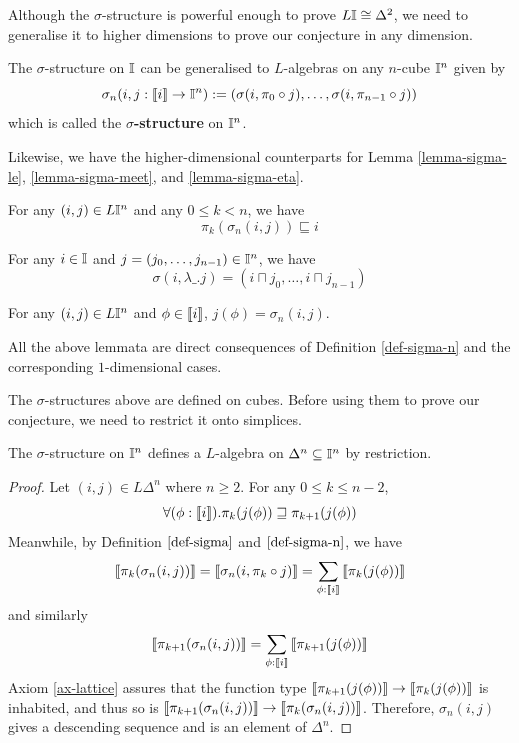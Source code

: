 Although the $\sigma$-structure is powerful enough to prove $L\mathbb{I}\cong\Delta^2$, we need to generalise it to higher dimensions to prove our conjecture in any dimension.
\begin{definition}
    \label{def-sigma-n}
    The $\sigma$-structure on $\mathbb{I}$ can be generalised to $L$-algebras on any $n$-cube $\mathbb{I}^n$ given by
    $$\sigma_n(i,j:\left\llbracket i\right\rrbracket\to\mathbb{I}^n):=(\sigma(i,\pi_0\circ j),\dots,\sigma(i,\pi_{n-1}\circ j))$$
    which is called the \textbf{$\sigma$-structure} on $\mathbb{I}^n$.
\end{definition}
Likewise, we have the higher-dimensional counterparts for Lemma \ref{lemma-sigma-le}, \ref{lemma-sigma-meet}, and \ref{lemma-sigma-eta}.
\begin{lemma}
    \label{lemma-sigma-le-n}
    For any $(i,j)\in L\mathbb{I}^n$ and any $0\le k< n$, we have
    $$\pi_k(\sigma_n(i,j))\sqsubseteq i$$
\end{lemma}
\begin{lemma}
    \label{lemma-sigma-meet-n}
    For any $i\in\mathbb{I}$ and $j=(j_0,\dots,j_{n-1})\in\mathbb{I}^n$, we have
    $$\sigma(i,\lambda\_.j)=(i\sqcap j_0,\dots,i\sqcap j_{n-1})$$
\end{lemma}
\begin{lemma}
    \label{lemma-sigma-eta-n}
    For any $(i,j)\in L\mathbb{I}^n$ and $\phi\in\left\llbracket i\right\rrbracket$, $j(\phi)=\sigma_n(i,j)$.
\end{lemma}
All the above lemmata are direct consequences of Definition \ref{def-sigma-n} and the corresponding $1$-dimensional cases.

The $\sigma$-structures above are defined on cubes. Before using them to prove our conjecture, we need to restrict it onto simplices.
\begin{lemma}
    The $\sigma$-structure on $\mathbb{I}^n$ defines a $L$-algebra on $\Delta^n\subseteq\mathbb{I}^n$ by restriction.
\end{lemma}
\begin{proof}
    Let $(i,j)\in L\Delta^n$ where $n\ge2$. For any $0\le k\le n-2$,
    $$\forall(\phi:\left\llbracket i\right\rrbracket).\pi_k(j(\phi))\sqsupseteq\pi_{k+1}(j(\phi))$$
    Meanwhile, by Definition $\ref{def-sigma}$ and $\ref{def-sigma-n}$, we have
    $$\left\llbracket\pi_k(\sigma_n(i,j))\right\rrbracket=\left\llbracket\sigma_n(i,\pi_k\circ j)\right\rrbracket=\sum_{\phi:\left\llbracket i\right\rrbracket}\left\llbracket\pi_k(j(\phi))\right\rrbracket$$
    and similarly
    $$\left\llbracket\pi_{k+1}(\sigma_n(i,j))\right\rrbracket=\sum_{\phi:\left\llbracket i\right\rrbracket}\left\llbracket\pi_{k+1}(j(\phi))\right\rrbracket$$
    Axiom \ref{ax-lattice} assures that the function type $\left\llbracket\pi_{k+1}(j(\phi))\right\rrbracket\to\left\llbracket\pi_k(j(\phi))\right\rrbracket$ is inhabited, and thus so is $\left\llbracket\pi_{k+1}(\sigma_n(i,j))\right\rrbracket\to\left\llbracket\pi_k(\sigma_n(i,j))\right\rrbracket$. Therefore, $\sigma_n(i,j)$ gives a descending sequence and is an element of $\Delta^n$.
\end{proof}

